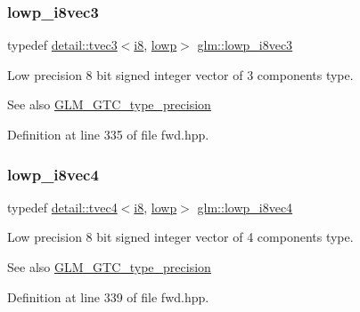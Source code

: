 \subsubsection{\texorpdfstring{lowp\+\_\+i8vec3}{lowp\_i8vec3}}
{\footnotesize\ttfamily typedef \hyperlink{structglm_1_1detail_1_1tvec3}{detail\+::tvec3}$<$\hyperlink{group__gtc__type__precision_gaae064be68b7d36cd7910c16e8ad18bba}{i8}, \hyperlink{namespaceglm_a0f04f086094c747d227af4425893f545ae161af3fc695e696ce3bf69f7332bc2d}{lowp}$>$ \hyperlink{group__gtc__type__precision_ga048811f03c327d4b56564a72d98800e8}{glm\+::lowp\+\_\+i8vec3}}

Low precision 8 bit signed integer vector of 3 components type. \begin{DoxySeeAlso}{See also}
\hyperlink{group__gtc__type__precision}{G\+L\+M\+\_\+\+G\+T\+C\+\_\+type\+\_\+precision} 
\end{DoxySeeAlso}


Definition at line 335 of file fwd.\+hpp.

\mbox{\label{group__gtc__type__precision_ga095202095a1fefbdae4a974c3b750223}} 
\subsubsection{\texorpdfstring{lowp\+\_\+i8vec4}{lowp\_i8vec4}}
{\footnotesize\ttfamily typedef \hyperlink{structglm_1_1detail_1_1tvec4}{detail\+::tvec4}$<$\hyperlink{group__gtc__type__precision_gaae064be68b7d36cd7910c16e8ad18bba}{i8}, \hyperlink{namespaceglm_a0f04f086094c747d227af4425893f545ae161af3fc695e696ce3bf69f7332bc2d}{lowp}$>$ \hyperlink{group__gtc__type__precision_ga095202095a1fefbdae4a974c3b750223}{glm\+::lowp\+\_\+i8vec4}}

Low precision 8 bit signed integer vector of 4 components type. \begin{DoxySeeAlso}{See also}
\hyperlink{group__gtc__type__precision}{G\+L\+M\+\_\+\+G\+T\+C\+\_\+type\+\_\+precision} 
\end{DoxySeeAlso}


Definition at line 339 of file fwd.\+hpp.

\mbox{\label{group__gtc__type__precision_ga71fc0c399fa4780507748b643733f153}} 
